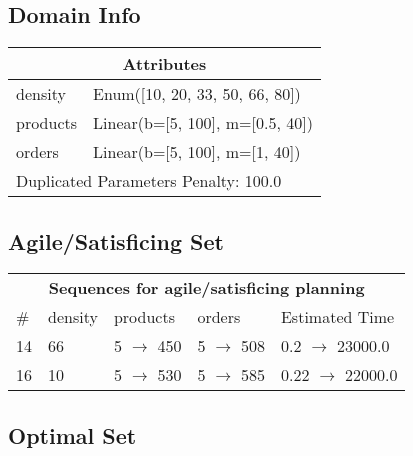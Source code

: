 \documentclass{article}
\begin{document}
                    \subsection*{Domain Info}

                    \begin{center}
                    \begin{tabular}{@{}p{}p{}@{}}
                    \multicolumn{2}{c}{\bf \large Attributes}\\\midrule
                    density & Enum([10, 20, 33, 50, 66, 80])\\
products & Linear(b=[5, 100], m=[0.5, 40])\\
orders & Linear(b=[5, 100], m=[1, 40])
                    
                     \\\midrule
                    \multicolumn{2}{l}{Duplicated Parameters Penalty: 100.0}
                    \end{tabular}
                    \end{center}
                
                         \subsection*{Agile/Satisficing Set}

                        \begin{center}
                        \begin{tabular}{@{}l|l|l|l|l@{}}
                        \multicolumn{5}{c}{\bf \large Sequences for agile/satisficing planning}\\
                        \# & density & products & orders & Estimated Time\\\midrule
                        14&66&5 $\rightarrow$ 450&5 $\rightarrow$ 508&0.2 $\rightarrow$ 23000.0\\
16&10&5 $\rightarrow$ 530&5 $\rightarrow$ 585&0.22 $\rightarrow$ 22000.0
                        \end{tabular}
                        \end{center}
                    
                            \subsection*{Optimal Set}
\end{document}

